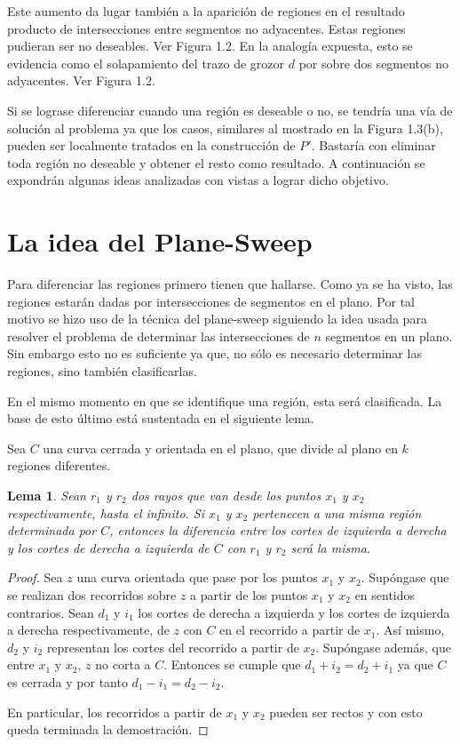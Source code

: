 \documentclass[12pt,english]{report}
\newtheorem{lemma}[theorem]{Lema}
\begin{document}
Este aumento da lugar tambi\'en a la aparici\'on de regiones en el resultado producto de intersecciones entre segmentos no adyacentes. Estas regiones pudieran ser no deseables. Ver Figura 1.2. En la analog\'ia expuesta, esto se evidencia como el solapamiento del trazo de grozor $d$ por sobre dos segmentos no adyacentes. Ver Figura 1.2.

Si se lograse diferenciar cuando una regi\'on es deseable o no, se tendr\'ia una v\'ia de soluci\'on al problema ya que los casos, similares al mostrado en la Figura 1.3(b), pueden ser localmente tratados en la construcci\'on de $P'$. Bastar\'ia con eliminar toda regi\'on no deseable y obtener el resto como resultado. A continuaci\'on se expondr\'an algunas ideas analizadas con vistas a lograr dicho objetivo. 

\section{La idea del Plane-Sweep} 

Para diferenciar las regiones primero tienen que hallarse. Como ya se ha visto, las regiones estar\'an dadas por intersecciones de segmentos en el plano. Por tal motivo se hizo uso de la t\'ecnica del plane-sweep siguiendo la idea usada para resolver el problema de determinar las intersecciones de $n$ segmentos en un plano. Sin embargo esto no es suficiente ya que, no s\'olo es necesario determinar las regiones, sino tambi\'en clasificarlas. 

En el mismo momento en que se identifique una regi\'on, esta ser\'a clasificada. La base de esto \'ultimo est\'a sustentada en el siguiente lema.     

\noindent Sea $C$ una curva cerrada y orientada en el plano, que divide al plano en $k$ regiones diferentes.

\begin{lemma}
Sean $r_{1}$ y $r_2$ dos rayos que van desde los puntos $x_1$ y $x_2$ respectivamente, hasta el infinito. Si $x_1$ y $x_2$ pertenecen a una misma regi\'on determinada por $C$, entonces la diferencia entre los cortes de izquierda a derecha y los cortes de derecha a izquierda de $C$ con $r_1$ y $r_2$ ser\'a la misma.
\end{lemma}

\begin{proof}
Sea $z$ una curva orientada que pase por los puntos $x_1$ y $x_2$. Sup\'ongase que se realizan dos recorridos sobre $z$ a partir de los puntos $x_1$ y $x_2$ en sentidos contrarios. Sean $d_1$ y $i_1$ los cortes de derecha a izquierda y los cortes de izquierda a derecha respectivamente, de $z$ con $C$ en el recorrido a partir de $x_1$. As\'i mismo, $d_2$ y $i_2$ representan los cortes del recorrido a partir de $x_2$. Sup\'ongase adem\'as, que entre $x_1$ y $x_2$, $z$ no corta a $C$. Entonces se cumple que $d_1 + i_2 = d_2 + i_1$ ya que $C$ es cerrada y por tanto $d_1 - i_1 = d_2 - i_2$. 

En particular, los recorridos a partir de $x_1$ y $x_2$ pueden ser rectos y con esto queda terminada la demostraci\'on.
\end{proof}
\end{document}

